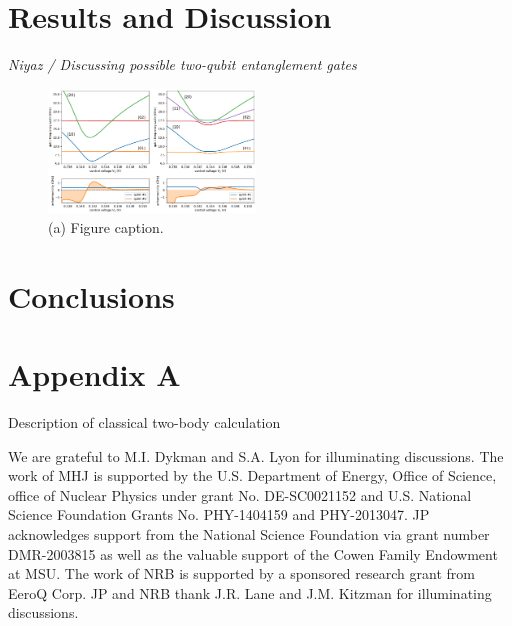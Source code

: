 \documentclass[twocolumn,superscriptaddress,unsortedaddress,
 amsmath,amssymb,
 aps,
]{revtex4-2}
\begin{document}
\section{Results and Discussion} %

\textit{Niyaz / Discussing possible two-qubit entanglement gates}


\begin{figure}
\includegraphics[width=0.49\textwidth]{figure3.pdf}
\caption{\label{fig3} (a) Figure caption.}
\end{figure}


\section{Conclusions} %


\section{Appendix A}
Description of classical two-body calculation


\begin{acknowledgments}
We are grateful to M.I. Dykman and S.A. Lyon for illuminating discussions. The work of MHJ is supported by the U.S. Department of Energy, Office of Science, office of Nuclear Physics under grant No. DE-SC0021152 and U.S. National Science Foundation Grants No. PHY-1404159 and PHY-2013047. JP acknowledges support from the National Science Foundation via grant number DMR-2003815 as well as the valuable support of the Cowen Family Endowment at MSU. The work of NRB is supported by a sponsored research grant from EeroQ Corp. JP and NRB thank J.R. Lane and J.M. Kitzman for illuminating discussions.
\end{acknowledgments}
\end{document}
